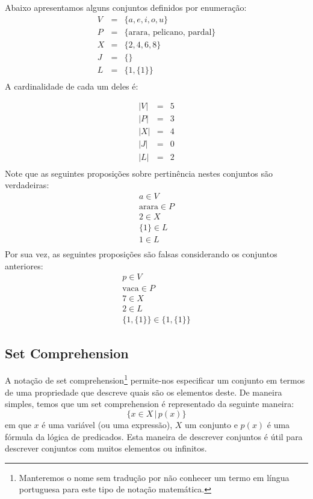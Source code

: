 \begin{Example}
Abaixo apresentamos alguns conjuntos definidos por enumeração:
\[
\begin{array}{lcl}
   V & = & \{a,e,i,o,u\} \\
   P & = & \{\text{arara, pelicano, pardal}\}\\
   X & = & \{2,4,6,8\} \\
   J & = & \{\}\\
  L & = & \{1, \{1\}\} \\
\end{array}
\]
A cardinalidade de cada um deles é:

\[
\begin{array}{lcl}
   |V| & = & 5 \\
   |P| & = & 3\\
   |X| & = & 4 \\
   |J| & = & 0\\
  |L| & = &2 \\
\end{array}
\]
Note que as seguintes proposições sobre pertinência nestes conjuntos
são verdadeiras:
\[
\begin{array}{l}
a \in V \\
\text{arara} \in P \\
2 \in X\\
\{1\} \in L\\
1 \in L\\
\end{array}
\]
Por sua vez, as seguintes proposições são falsas considerando os
conjuntos anteriores:
\[
\begin{array}{l}
p \in V \\
\text{vaca}\in P \\
7 \in X \\
2 \in L \\
\{1,\{1\}\} \in \{1,\{1\}\}
\end{array}
\]
\end{Example}

\subsection{Set Comprehension}

A notação de set comprehension\footnote{Manteremos o nome sem tradução
    por não conhecer um termo em língua portuguesa para este tipo de
    notação matemática.} permite-nos especificar um conjunto em
termos de uma propriedade que descreve quais são os elementos deste.
De maneira simples, temos que um set comprehension é
representado da seguinte maneira:
\[\{x  \in X\,|\,p(x)\}\]
em que $x$ é uma variável  (ou uma expressão), $X$ um conjunto e $p(x)$ é uma fórmula
da lógica de predicados. Esta maneira de descrever conjuntos é útil
para descrever conjuntos com muitos elementos ou infinitos.

